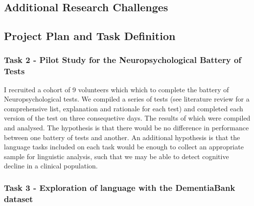 \documentclass[12pt, twoside, a4paper]{article}
\begin{document}
\subsection{Additional Research Challenges}

\subsection{Project Plan and Task Definition}
\subsubsection{Task 2 - Pilot Study for the Neuropsychological Battery of Tests}
I recruited a cohort of 9 volunteers which which to complete the battery of Neuropsychological tests. We compiled a series of tests (see literature review for a comprehensive list, explanation and rationale for each test) and completed each version of the test on three consequetive days. The results of which were compiled and analysed. The hypothesis is that there would be no difference in performance between one battery of tests and another. An additional hypothesis is that the language tasks included on each task would be enough to collect an appropriate sample for linguistic analysis, such that we may be able to detect cognitive decline in a clinical population. \newline
\subsubsection{Task 3 - Exploration of language with the DementiaBank dataset}
\end{document}
